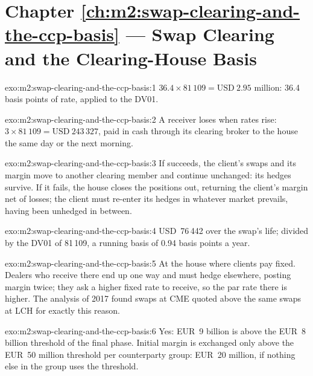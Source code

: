 \section*{Chapter \ref{ch:m2:swap-clearing-and-the-ccp-basis} --- Swap Clearing and the Clearing-House Basis}

\begin{solution}{exo:m2:swap-clearing-and-the-ccp-basis:1}
$36.4 \times 81\,109 = \text{USD}~2.95$ million: 36.4 basis points of rate, applied to
the DV01.
\end{solution}

\begin{solution}{exo:m2:swap-clearing-and-the-ccp-basis:2}
A receiver loses when rates rise: $3 \times 81\,109 = \text{USD}~243\,327$, paid in cash
through its clearing broker to the house the same day or the next morning.
\end{solution}

\begin{solution}{exo:m2:swap-clearing-and-the-ccp-basis:3}
If  succeeds, the client's swaps and its margin move to another
clearing member and continue unchanged: its hedges survive. If it fails, the
house closes the positions out, returning the client's margin net of losses;
the client must re-enter its hedges in whatever market prevails, having been
unhedged in between.
\end{solution}

\begin{solution}{exo:m2:swap-clearing-and-the-ccp-basis:4}
USD~76\,442 over the swap's life; divided by the DV01 of 81\,109, a running basis
of 0.94 basis points a year.
\end{solution}

\begin{solution}{exo:m2:swap-clearing-and-the-ccp-basis:5}
At the house where clients pay fixed. Dealers who receive there end up one way
and must hedge elsewhere, posting margin twice; they ask a higher fixed rate to
receive, so the par rate there is higher. The analysis of 2017 found swaps at
CME quoted above the same swaps at LCH for exactly this reason.
\end{solution}

\begin{solution}{exo:m2:swap-clearing-and-the-ccp-basis:6}
Yes: EUR~9 billion is above the EUR~8 billion threshold of the final phase.
Initial margin is exchanged only above the EUR~50 million threshold per
counterparty group: EUR~20 million, if nothing else in the group uses the
threshold.
\end{solution}

